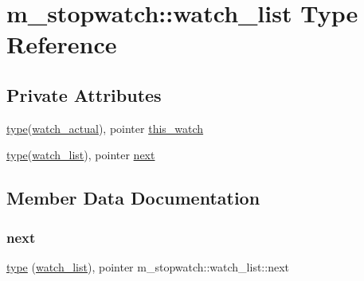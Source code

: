 \hypertarget{structm__stopwatch_1_1watch__list}{}\section{m\+\_\+stopwatch\+:\+:watch\+\_\+list Type Reference}
\label{structm__stopwatch_1_1watch__list}
\subsection*{Private Attributes}
\begin{DoxyCompactItemize}
\item 
\hyperlink{stop__watch_83_8txt_a70f0ead91c32e25323c03265aa302c1c}{type}(\hyperlink{structm__stopwatch_1_1watch__actual}{watch\+\_\+actual}), pointer \hyperlink{structm__stopwatch_1_1watch__list_ac8234d58cf4e9e41c2debff4c807f461}{this\+\_\+watch}
\item 
\hyperlink{stop__watch_83_8txt_a70f0ead91c32e25323c03265aa302c1c}{type}(\hyperlink{structm__stopwatch_1_1watch__list}{watch\+\_\+list}), pointer \hyperlink{structm__stopwatch_1_1watch__list_a898fce86de28e07bf5f627baf40f35f0}{next}
\end{DoxyCompactItemize}


\subsection{Member Data Documentation}
\mbox{\label{structm__stopwatch_1_1watch__list_a898fce86de28e07bf5f627baf40f35f0}} 
\subsubsection{\texorpdfstring{next}{next}}
{\footnotesize\ttfamily \hyperlink{stop__watch_83_8txt_a70f0ead91c32e25323c03265aa302c1c}{type} (\hyperlink{structm__stopwatch_1_1watch__list}{watch\+\_\+list}), pointer m\+\_\+stopwatch\+::watch\+\_\+list\+::next\hspace{0.3cm}{\ttfamily [private]}}

\mbox{\label{structm__stopwatch_1_1watch__list_ac8234d58cf4e9e41c2debff4c807f461}} 
